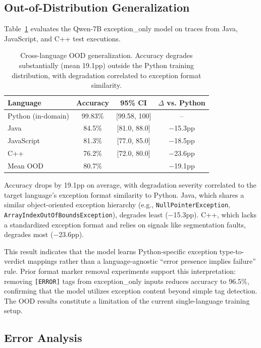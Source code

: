 \documentclass[11pt]{article}
\begin{document}
\subsection{Out-of-Distribution Generalization}
\label{sec:ood}

Table~\ref{tab:ood} evaluates the Qwen-7B exception\_only model on traces from Java, JavaScript, and C++ test executions.

\begin{table}[t]
\centering
\caption{Cross-language OOD generalization. Accuracy degrades substantially (mean 19.1pp) outside the Python training distribution, with degradation correlated to exception format similarity.}
\label{tab:ood}
\begin{tabular}{lccc}
\toprule
Language & Accuracy & 95\% CI & $\Delta$ vs. Python \\
\midrule
Python (in-domain) & 99.83\% & [99.58, 100] & -- \\
Java & 84.5\% & [81.0, 88.0] & $-$15.3pp \\
JavaScript & 81.3\% & [77.0, 85.0] & $-$18.5pp \\
C++ & 76.2\% & [72.0, 80.0] & $-$23.6pp \\
\midrule
Mean OOD & 80.7\% & & $-$19.1pp \\
\bottomrule
\end{tabular}
\end{table}

Accuracy drops by 19.1pp on average, with degradation severity correlated to the target language's exception format similarity to Python. Java, which shares a similar object-oriented exception hierarchy (e.g., \texttt{NullPointerException}, \texttt{ArrayIndexOutOfBoundsException}), degrades least ($-$15.3pp). C++, which lacks a standardized exception format and relies on signals like segmentation faults, degrades most ($-$23.6pp).

This result indicates that the model learns Python-specific exception type-to-verdict mappings rather than a language-agnostic ``error presence implies failure'' rule. Prior format marker removal experiments support this interpretation: removing \texttt{[ERROR]} tags from exception\_only inputs reduces accuracy to 96.5\%, confirming that the model utilizes exception content beyond simple tag detection. The OOD results constitute a limitation of the current single-language training setup.

\subsection{Error Analysis}
\label{sec:errors}
\end{document}

